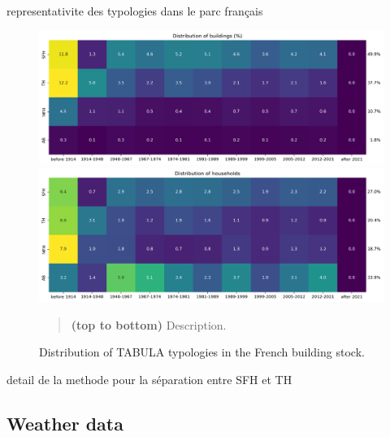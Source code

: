 \documentclass[11pt]{article}
\begin{document}
        representativite des typologies dans le parc français 
        \begin{figure}[ht]
            \centering
            \includegraphics[width=0.99\columnwidth]{figures/bgc_distribution_tabula_buildings_ponderated.png}\\
            \includegraphics[width=0.99\columnwidth]{figures/bgc_distribution_tabula_households_ponderated.png}
            \caption{\label{fig:tab_stock} Distribution of TABULA typologies in the French building stock.}
            \begin{quote}
                \vspace{-2mm}
                \small\noindent
                \textbf{(top to bottom)} Description.  
              \end{quote}
        \end{figure}

        detail de la methode pour la séparation entre SFH et TH

        






    


    \subsection{Weather data} %
    \label{sub:weather_data}
\end{document}

